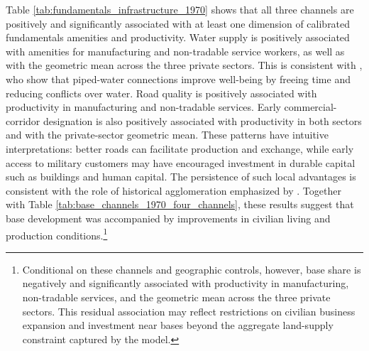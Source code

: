 \documentclass[12pt, unicode, a4paper]{article}
\newcommand{\1}{\mbox{1}\hspace{-0.25em}\mbox{l}} %
\begin{document}
Table \ref{tab:fundamentals_infrastructure_1970} shows that all three channels are positively and significantly associated with at least one dimension of calibrated fundamentals amenities and productivity. Water supply is positively associated with amenities for manufacturing and non-tradable service workers, as well as with the geometric mean across the three private sectors. This is consistent with \citet{devoto2012happiness}, who show that piped-water connections improve well-being by freeing time and reducing conflicts over water. Road quality is positively associated with productivity in manufacturing and non-tradable services. Early commercial-corridor designation is also positively associated with productivity in both sectors and with the private-sector geometric mean. These patterns have intuitive interpretations: better roads can facilitate production and exchange, while early access to military customers may have encouraged investment in durable capital such as buildings and human capital. The persistence of such local advantages is consistent with the role of historical agglomeration emphasized by \citet{allen2020persistence}. Together with Table \ref{tab:base_channels_1970_four_channels}, these results suggest that base development was accompanied by improvements in civilian living and production conditions.\footnote{Conditional on these channels and geographic controls, however, base share is negatively and significantly associated with productivity in manufacturing, non-tradable services, and the geometric mean across the three private sectors. This residual association may reflect restrictions on civilian business expansion and investment near bases beyond the aggregate land-supply constraint captured by the model.}
\end{document}
